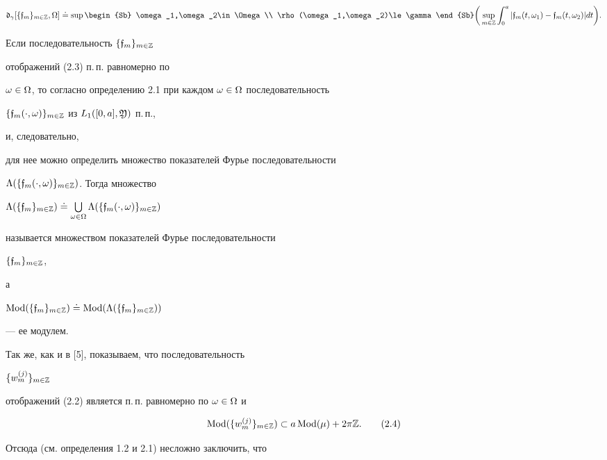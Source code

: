 $$


\frak d_{\gamma}[\{\gf_m\}_{m\in\Bbb Z},\Omega]\doteq


\sup\begin{Sb}


\omega_1,\omega_2\in\Omega \\ \rho(\omega_1,\omega_2)\le \gamma\end{Sb}


\bigg(\sup\limits_{m\in\Bbb Z}


\int_0^a |\gf_{m}(t,\omega_1)-\gf_m(t,\omega_2)|dt\bigg).


$$


Если последовательность $\{\frak f_m\}_{m\in\Bbb Z}$


отображений (2.3) п.\,п. равномерно по


$\omega\in\Omega$, то согласно определению 2.1 при каждом $\omega\in\Omega$ последовательность


$\{\frak f_m(\cdot,\omega)\}_{m\in\Bbb Z}$ из $L_1([0,a],\frak Y)$ п.\,п.,


и, следовательно,


для нее можно определить множество показателей Фурье последовательности


$\Lambda(\{\frak f_m(\cdot,\omega)\}_{m\in\Bbb Z})$. Тогда множество


$\Lambda(\{\gf_m\}_{m\in\Bbb Z})\doteq


\bigcup\limits_{\mm}\Lambda(\{\gf_m(\cdot,\omega)\}_{m\in\Bbb Z})$


называется множеством показателей Фурье последовательности


$\{\frak f_m\}_{m\in\Bbb Z}$,


а


$\operatorname{Mod}(\{\frak f_m\}_{m\in\Bbb Z})\doteq \operatorname{Mod}(\Lambda(\{\frak f_m\}_{m\in\Bbb Z}))$


--- ее модулем.





Так же, как и в [5], показываем, что последовательность


$\{w_m^{(j)}\}_{m\in\Bbb Z}$


отображений (2.2) является п.\,п. равномерно по $\omega\in\Omega$ и


\begin{equation}


\Mod(\{w_m^{(j)}\}_{m\in\Bbb Z}) \subset a\Mod (\mu)+2\pi\Bbb Z.\tag{2.4}


\end{equation}


Отсюда (см. определения 1.2 и 2.1) несложно заключить, что


